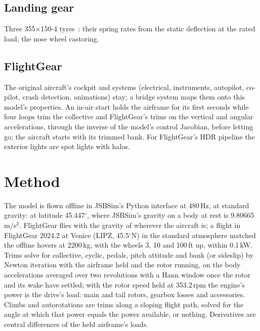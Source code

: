 \documentclass[10pt,a4paper,twocolumn]{article}
\begin{document}
\subsection{Landing gear}
Three 355$\times$150-4 tyres~\cite{mi}: their spring rates from the static deflection at the rated load, the nose wheel castoring.

\subsection{FlightGear}
The original aircraft's cockpit and systems (electrical, instruments, autopilot, co-pilot, crash detection, animations) stay; a bridge
system maps them onto this model's properties. An in-air start holds the airframe for its first seconds while four loops trim the
collective and FlightGear's trims on the vertical and angular accelerations, through the inverse of the model's control Jacobian, before
letting go; the aircraft starts with its trimmed bank. For FlightGear's HDR pipeline the exterior lights are spot lights with halos.

\section{Method}\label{sec:method}
The model is flown offline in JSBSim's Python interface at 480\,Hz, at standard gravity: at latitude 45.447$^\circ$, where JSBSim's
gravity on a body at rest is 9.80665\,m/s$^2$. FlightGear flies with the gravity of wherever the aircraft is; a flight in FlightGear
2024.2 at Venice (LIPZ, 45.5$^\circ$N) in the standard atmosphere matched the offline hovers at 2200\,kg, with the wheels 3, 10 and
100\,ft up, within 0.1\,kW. Trims solve for collective, cyclic, pedals, pitch attitude and bank (or
sideslip) by Newton iteration with the airframe held and the rotor running, on the body accelerations averaged over two revolutions with a
Hann window once the rotor and its wake have settled; with the rotor speed held at 353.2\,rpm the engine's power is the drive's load: main
and tail rotors, gearbox losses and accessories. Climbs and autorotations are trims along a sloping flight path, solved for the angle at
which that power equals the power available, or nothing. Derivatives are central differences of the held airframe's loads.
\end{document}
